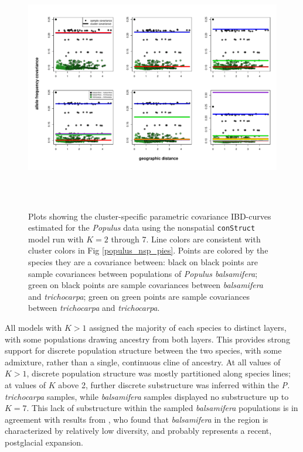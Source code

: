 \documentclass[12pt]{article}
\newcommand{\tri}{\textit{trichocarpa}}
\newcommand{\bals}{\textit{balsamifera}}
\begin{document}
\begin{figure}
	\centering
		{\includegraphics[width=6in,height=4in]{figs/populus/populus_nsp_clst_covs.pdf}}
	\caption{
	Plots showing the cluster-specific parametric covariance IBD-curves 
	estimated for the \textit{Populus} data using 
	the nonspatial \texttt{conStruct} model run with $K=2$ through 7.
	Line colors are consistent with cluster colors in Fig \ref{populus_nsp_pies}.
	Points are colored by the species they are a covariance between:
	black on black points are sample covariances between populations of \textit{Populus balsamifera};
	green on black points are sample covariances between \bals{} and \tri{};
	green on green points are sample covariances between \tri{} and \tri{}.
    }\label{populus_nsp_clst_covs}
\end{figure}

All models with $K>1$ assigned the majority of each species
to distinct layers, with some populations drawing ancestry from both layers.
This provides strong support for discrete population structure between the two species,
with some admixture,
rather than a single, continuous cline of ancestry.
At all values of $K>1$, discrete population structure was mostly partitioned along species lines; 
at values of $K$ above 2, further discrete substructure was inferred within the \textit{P. trichocarpa} samples, 
while \bals{} samples displayed no substructure up to $K=7$.
This lack of substructure within the sampled \bals{} populations is in agreement with results from 
\citet{keller_etal_2010}, who found that \bals{} in the region is characterized by relatively low diversity, 
and probably represents a recent, postglacial expansion.
\end{document}
